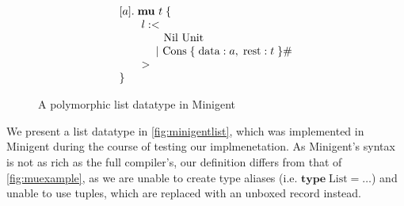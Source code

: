 \begin{figure}
    \centering
    \[
        \begin{array}{l}
            [a].\; \textbf{mu}\ t\; \{ \\
            \hspace{2em} l: < \\
            \hspace{4em}    \text{Nil Unit} \\
            \hspace{3.3em}  |\ \text{Cons}\; \{\; \text{data}: a,\; \text{rest}: t\; \}\# \\ 
            \hspace{2em} > \\
            \}
        \end{array}    
    \]
    \caption{A polymorphic list datatype in Minigent}
    \label{fig:minigentlist}
\end{figure}

We present a list datatype in \autoref{fig:minigentlist}, which was implemented in Minigent during the course
of testing our implmenetation. As Minigent's syntax is not as rich as the full compiler's,
our definition differs from that of \autoref{fig:muexample}, as we are unable to create
type aliases (i.e. $\textbf{type}\; \text{List} = \dots$) and unable to use tuples,
which are replaced with an unboxed record instead.

